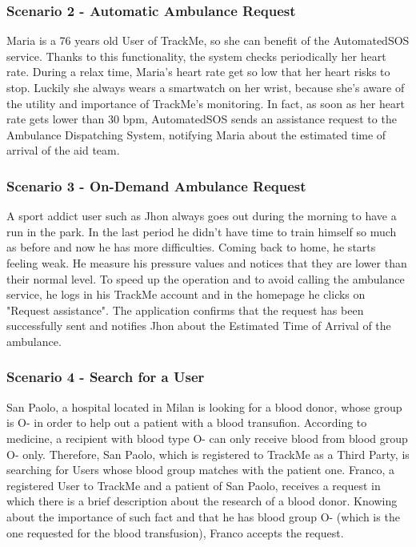 \documentclass[12pt,a4paper]{article}
\begin{document}
	\subsubsection*{Scenario 2 - Automatic Ambulance Request}
		Maria is a 76 years old User of TrackMe, so she can benefit of the AutomatedSOS service. Thanks to this functionality, the system checks periodically her heart rate. During a relax time, Maria's heart rate get so low that her heart risks to stop. Luckily she always wears a smartwatch on her wrist, because she's aware of the utility and importance of TrackMe's monitoring. In fact, as soon as her heart rate gets lower than 30 bpm, AutomatedSOS sends an assistance request to the Ambulance Dispatching System, notifying Maria about the estimated time of arrival of the aid team.
	
	\subsubsection*{Scenario 3 - On-Demand Ambulance Request}
		A sport addict user such as Jhon always goes out during the morning to have a run in the park. 
		In the last period he didn't have time to train himself so much as before and now he has more difficulties. Coming back to home, he starts feeling weak. He measure his pressure values and notices that they are lower than their normal level. To speed up the operation and to avoid calling the ambulance service, he logs in his TrackMe account and in the homepage he clicks on "Request assistance". The application confirms that the request has been successfully sent and notifies Jhon about the Estimated Time of Arrival of the ambulance.
	
	\subsubsection*{Scenario 4 - Search for a User}
		San Paolo, a hospital located in Milan is looking for a blood donor, whose  group is O- in order to help out a patient with a blood transufion. According to medicine, a recipient with blood type O- can only receive blood from blood group O- only. Therefore, San Paolo, which is registered to TrackMe as a Third Party, is searching for Users whose blood group matches with the patient one.
		Franco, a registered User to TrackMe and a patient of San Paolo, receives a request in which there is a brief description about the research of a blood donor. Knowing about the importance of such fact and that he has blood group O- (which is the one requested for the blood transfusion), Franco accepts the request.
		
\end{document}

